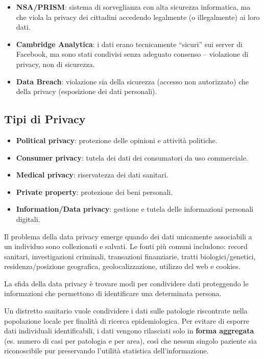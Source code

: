 \documentclass[a4paper,11pt]{article}
\begin{document}
\begin{esempio}
\begin{itemize}
  \item \textbf{NSA/PRISM}: sistema di sorveglianza con alta sicurezza informatica, ma che viola la privacy dei cittadini accedendo legalmente (o illegalmente) ai loro dati.
  \item \textbf{Cambridge Analytica}: i dati erano tecnicamente ``sicuri'' sui server di Facebook, ma sono stati condivisi senza adeguato consenso -- violazione di privacy, non di sicurezza.
  \item \textbf{Data Breach}: violazione sia della sicurezza (accesso non autorizzato) che della privacy (esposizione dei dati personali).
\end{itemize}
\end{esempio}

\subsection{Tipi di Privacy}
\begin{itemize}
  \item \textbf{Political privacy}: protezione delle opinioni e attivit\`{a} politiche.
  \item \textbf{Consumer privacy}: tutela dei dati dei consumatori da uso commerciale.
  \item \textbf{Medical privacy}: riservatezza dei dati sanitari.
  \item \textbf{Private property}: protezione dei beni personali.
  \item \textbf{Information/Data privacy}: gestione e tutela delle informazioni personali digitali.
\end{itemize}

\begin{definizione}
Il problema della data privacy emerge quando dei dati unicamente associabili a un individuo sono collezionati e salvati. Le fonti pi\`{u} comuni includono: record sanitari, investigazioni criminali, transazioni finanziarie, tratti biologici/genetici, residenza/posizione geografica, geolocalizzazione, utilizzo del web e cookies.

La sfida della data privacy \`{e} trovare modi per condividere dati proteggendo le informazioni che permettono di identificare una determinata persona.
\end{definizione}

\begin{esempio}
Un distretto sanitario vuole condividere i dati sulle patologie riscontrate nella popolazione locale per finalit\`{a} di ricerca epidemiologica. Per evitare di esporre dati individuali identificabili, i dati vengono rilasciati solo in \textbf{forma aggregata} (es. numero di casi per patologia e per area), cos\`{i} che nessun singolo paziente sia riconoscibile pur preservando l'utilit\`{a} statistica dell'informazione.
\end{esempio}
\end{document}
